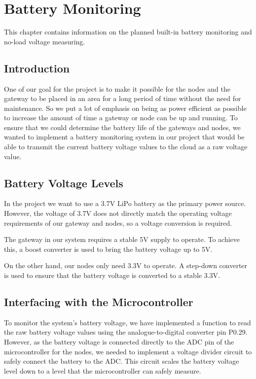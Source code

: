 \section{Battery Monitoring}

This chapter contains information on the planned built-in battery monitoring and no-load voltage measuring.

\subsection{Introduction}

One of our goal for the project is to make it possible for the nodes and the gateway to be placed in an area for a long period of time without the need for maintenance. So we put a lot of emphasis on being as power efficient as possible to increase the amount of time a gateway or node can be up and running. To ensure that we could determine the battery life of the gateways and nodes, we wanted to implement a battery monitoring system in our project that would be able to transmit the current battery voltage values to the cloud as a raw voltage value.

\subsection{Battery Voltage Levels}

In the project we want to use a 3.7V LiPo battery as the primary power source. However, the voltage of 3.7V does not directly match the operating voltage requirements of our gateway and nodes, so a voltage conversion is required.

The gateway in our system requires a stable 5V supply to operate. To achieve this, a boost converter is used to bring the battery voltage up to 5V.

On the other hand, our nodes only need 3.3V to operate. A step-down converter is used to ensure that the battery voltage is converted to a stable 3.3V.

\subsection{Interfacing with the Microcontroller}

To monitor the system's battery voltage, we have implemented a function to read the raw battery voltage values using the analogue-to-digital converter pin P0.29. However, as the battery voltage is connected directly to the ADC pin of the microcontroller for the nodes, we needed to implement a voltage divider circuit to safely connect the battery to the ADC. This circuit scales the battery voltage level down to a level that the microcontroller can safely measure.


